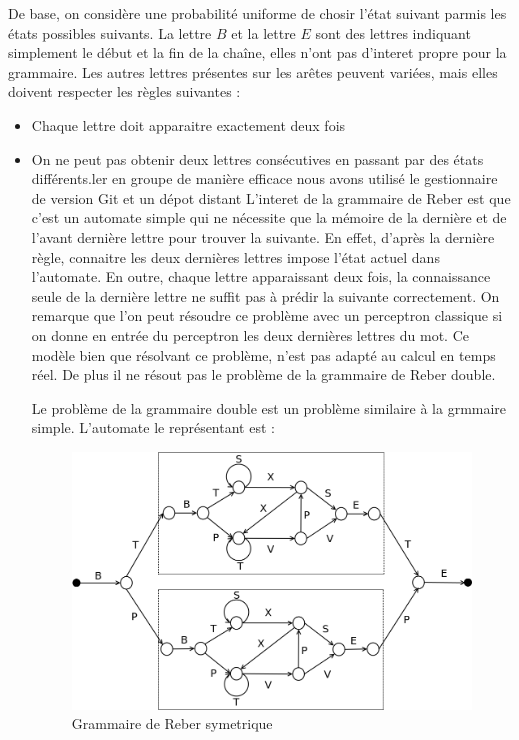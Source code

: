 De base, on considère une probabilité uniforme de chosir l'état suivant parmis
les états possibles suivants. La lettre $B$ et la lettre $E$ sont des lettres
indiquant simplement le début et la fin de la chaîne, elles n'ont pas d'interet
propre pour la grammaire. Les autres lettres présentes sur les arêtes peuvent
variées, mais elles doivent respecter les règles suivantes :
\medskip
\begin{itemize}
	\item Chaque lettre doit apparaitre exactement deux fois
	\item On ne peut pas obtenir deux lettres consécutives en passant par des
états différents.ler en groupe de manière efficace nous avons utilisé le
gestionnaire de version Git et un dépot distant 
\vspace{\parskip}
L'interet de la grammaire de Reber est que c'est un automate simple qui ne
nécessite que la mémoire de la dernière et de l'avant dernière lettre pour
trouver la suivante. En effet, d'après la dernière règle, connaitre les deux
dernières lettres impose l'état actuel dans l'automate. En outre, chaque lettre
apparaissant deux fois, la connaissance seule de la dernière lettre ne suffit
pas à prédir la suivante correctement. On remarque que l'on peut résoudre ce
problème avec un perceptron classique si on donne en entrée du perceptron les
deux dernières lettres du mot. Ce modèle bien que résolvant ce problème, n'est
pas adapté au calcul en temps réel. De plus il ne résout pas le problème de la
grammaire de Reber double.

Le problème de la grammaire double est un problème similaire à la grmmaire
simple. L'automate le représentant est :

\begin{figure}[!ht]
\begin{center}
\includegraphics[scale=0.4]{images/reberGrammarSymmetric.png}
\end{center}
\caption{Grammaire de Reber symetrique}
\end{figure}


\end{itemize}
